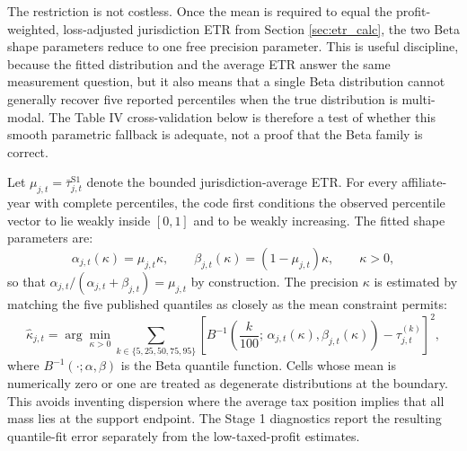 \documentclass[11pt,a4paper]{article}
\begin{document}
The restriction is not costless. Once the mean is required to equal the profit-weighted, loss-adjusted jurisdiction ETR from Section \ref{sec:etr_calc}, the two Beta shape parameters reduce to one free precision parameter. This is useful discipline, because the fitted distribution and the average ETR answer the same measurement question, but it also means that a single Beta distribution cannot generally recover five reported percentiles when the true distribution is multi-modal. The Table IV cross-validation below is therefore a test of whether this smooth parametric fallback is adequate, not a proof that the Beta family is correct.

Let $\mu_{j,t} = \bar{\tau}_{j,t}^{\text{S1}}$ denote the bounded jurisdiction-average ETR. For every affiliate-year with complete percentiles, the code first conditions the observed percentile vector to lie weakly inside $[0,1]$ and to be weakly increasing. The fitted shape parameters are:
\begin{equation}\label{eq:beta_shape}
\alpha_{j,t}(\kappa) = \mu_{j,t}\kappa, \qquad
\beta_{j,t}(\kappa) = (1-\mu_{j,t})\kappa, \qquad \kappa>0,
\end{equation}
so that $\alpha_{j,t}/(\alpha_{j,t}+\beta_{j,t}) = \mu_{j,t}$ by construction. The precision $\kappa$ is estimated by matching the five published quantiles as closely as the mean constraint permits:
\begin{equation}\label{eq:beta_fit}
\hat{\kappa}_{j,t}
= \arg\min_{\kappa>0}
\sum_{k \in \{5,25,50,75,95\}}
\left[
B^{-1}\!\left(\frac{k}{100};\,\alpha_{j,t}(\kappa),\beta_{j,t}(\kappa)\right)
- \tau_{j,t}^{(k)}
\right]^2 ,
\end{equation}
where $B^{-1}(\cdot;\alpha,\beta)$ is the Beta quantile function. Cells whose mean is numerically zero or one are treated as degenerate distributions at the boundary. This avoids inventing dispersion where the average tax position implies that all mass lies at the support endpoint. The Stage 1 diagnostics report the resulting quantile-fit error separately from the low-taxed-profit estimates.
\end{document}
